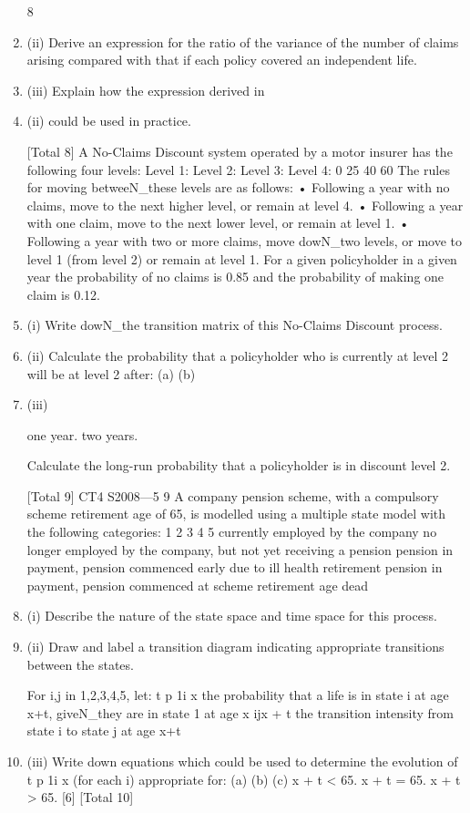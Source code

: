 \documentclass[a4paper,12pt]{article}
\begin{document}
\begin{enumerate}
8
\item (ii) Derive an expression for the ratio of the variance of the number of claims
arising compared with that if each policy covered an independent life.

\item (iii) Explain how the expression derived in \item (ii) could be used in practice.

[Total 8]
A No-Claims Discount system operated by a motor insurer has the following four
levels:
Level 1:
Level 2:
Level 3:
Level 4:
0%
25%
40%
60%
The rules for moving betweeN_these levels are as follows:
• Following a year with no claims, move to the next higher level, or remain at
level 4.
• Following a year with one claim, move to the next lower level, or remain at
level 1.
• Following a year with two or more claims, move dowN_two levels, or move to
level 1 (from level 2) or remain at level 1.
For a given policyholder in a given year the probability of no claims is 0.85 and the
probability of making one claim is 0.12.
\item (i) Write dowN_the transition matrix of this No-Claims Discount process.
\item (ii) Calculate the probability that a policyholder who is currently at level 2 will be
at level 2 after:
(a)
(b)
\item (iii)

one year.
two years.

Calculate the long-run probability that a policyholder is in discount level 2.

[Total 9]
CT4 S2008—5
9
A company pension scheme, with a compulsory scheme retirement age of 65, is
modelled using a multiple state model with the following categories:
1
2
3
4
5 currently employed by the company
no longer employed by the company, but not yet receiving a pension
pension in payment, pension commenced early due to ill health retirement
pension in payment, pension commenced at scheme retirement age
dead
\item (i) Describe the nature of the state space and time space for this process.
\item (ii) Draw and label a transition diagram indicating appropriate transitions between
the states.


For i,j in {1,2,3,4,5}, let:
t
p 1i x
the probability that a life is in state i at age x+t, giveN_they are in state 1 at age
x
\mu ijx + t the transition intensity from state i to state j at age x+t
\item (iii) Write down equations which could be used to determine the evolution of t p 1i x
(for each i) appropriate for:
(a)
(b)
(c)
x + t < 65.
x + t = 65.
x + t > 65.
[6]
[Total 10]


\end{enumerate}
\end{document}
